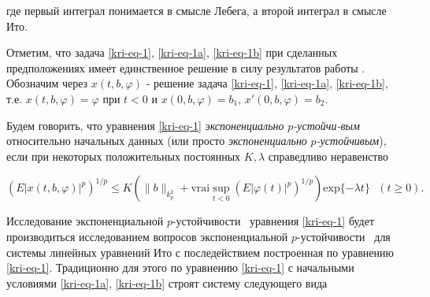 где первый интеграл понимается в смысле Лебега, а второй интеграл в смысле Ито.

Отметим, что задача \eqref{kri-eq-1}, \eqref{kri-eq-1a}, \eqref{kri-eq-1b} при сделанных предположениях имеет единственное решение в силу результатов работы \cite{kri-bib-10}. Обозначим через $x(t,b,\varphi )$ - решение задача \eqref{kri-eq-1}, \eqref{kri-eq-1a}, \eqref{kri-eq-1b}, т.е. $x(t,b,\varphi)=\varphi$ при $t<0$ и $x(0,b,\varphi)=b_1$, $x'(0,b,\varphi)=b_2$.

\begin{definition}
Будем говорить, что уравнения \eqref{kri-eq-1} \textit{экспоненциально } $p$\textit{{}-устойчи-\linebreak вым}
относительно начальных данных (или просто \textit{экспоненциально } $p$\textit{{}-устойчивым}), если при некоторых
положительных постоянных  $K, \lambda$ справедливо неравенство

\begin{equation*}
(E|x(t,b,\varphi )|^p)^{1/p}\le K\left(\|b\|_{k_p^2}+ \mathrm{vrai} \sup\limits_{t<0}(E|\varphi
(t)|^p)^{1/p}\right)\mathrm{exp}\{-\mathit{\lambda t}\}\text{  }(t\geq 0).
\end{equation*}
\end{definition}

Исследование экспоненциальной  $p${}-устойчивости \ уравнения \eqref{kri-eq-1} будет производиться исследованием вопросов
экспоненциальной  $p${}-устойчивости \ для системы линейных уравнений Ито с последействием построенная по уравнению
\eqref{kri-eq-1}. Традиционно для этого по уравнению \eqref{kri-eq-1} с начальными условиями \eqref{kri-eq-1a}, \eqref{kri-eq-1b} строят систему следующего вида

